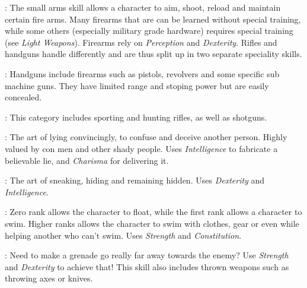 : The small arms skill allows a character to aim, shoot, reload
and maintain certain fire arms. Many firearms that are can be learned without
special training, while some others (especially military grade hardware)
requires special training (see \emph{Light Weapons}). Firearms rely on
\emph{Perception} and \emph{Dexterity}. Rifles and handguns handle differently
and are thus split up in two separate speciality skills.

: Handguns include firearms such as
pistols, revolvers and some specific sub machine guns. They have limited range
and stoping power but are easily concealed.

: This category includes sporting and
hunting rifles, as well as shotguns.

: The art of lying convincingly, to confuse and deceive
another person. Highly valued by con men and other shady people. Uses
\emph{Intelligence} to fabricate a believable lie, and \emph{Charisma} for
delivering it.

: The art of sneaking, hiding and remaining hidden. Uses
\emph{Dexterity} and \emph{Intelligence}.

: Zero rank allows the character to float, while the first rank
allows a character to swim. Higher ranks allows the character to swim with
clothes, gear or even while helping another who can't swim. Uses \emph{Strength}
and \emph{Constitution}.

: Need to make a grenade go really far away towards the enemy?
Use \emph{Strength} and \emph{Dexterity} to achieve that! This skill also
includes thrown weapons such as throwing axes or knives.
